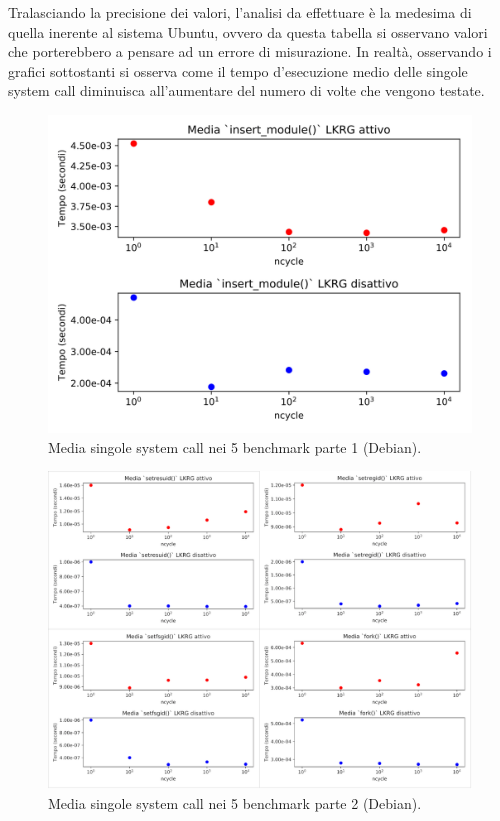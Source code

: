 Tralasciando la precisione dei valori, l'analisi da effettuare è la medesima di quella inerente al sistema Ubuntu, ovvero da questa tabella si osservano valori che porterebbero a pensare ad un errore di misurazione. In realtà, osservando i grafici sottostanti si osserva come il tempo d'esecuzione medio delle singole system call diminuisca all'aumentare del numero di volte che vengono testate.

\clearpage

\begin{figure}[!htbp]
\centering
\includegraphics[scale=0.22]{Figures/Debian/Mean1}
\caption[Media singole system call nei 5 benchmark parte 1 (Debian)]{Media singole system call nei 5 benchmark parte 1 (Debian).}
\label{fig:mean1DebianFig}
\end{figure}

\begin{figure}[!htbp]
\centering
\includegraphics[scale=1.4]{Figures/Debian/Mean2}
\caption[Media singole system call nei 5 benchmark parte 2 (Debian)]{Media singole system call nei 5 benchmark parte 2 (Debian).}
\label{fig:mean2DebianFig}
\end{figure}

